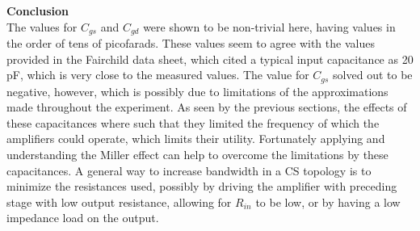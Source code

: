\documentclass[12pt]{article}
\begin{document}
\textbf{Conclusion}\\
The values for $C_{gs}$ and $C_{gd}$ were shown to be non-trivial here, having values in the order of tens of picofarads. These values seem to agree with the values provided in the Fairchild data sheet, which cited a typical input capacitance as 20 pF, which is very close to the measured values. The value for $C_{gs}$ solved out to be negative, however, which is possibly due to limitations of the approximations made throughout the experiment. As seen by the previous sections, the effects of these capacitances where such that they limited the frequency of which the amplifiers could operate, which limits their utility. Fortunately applying and understanding the Miller effect can help to overcome the limitations  by these capacitances. A general way to increase bandwidth in a CS topology is to minimize the resistances used, possibly by driving the amplifier with preceding stage with low output resistance, allowing for $R_{in}$ to be low, or by having a low impedance load on the output.
\end{document}
